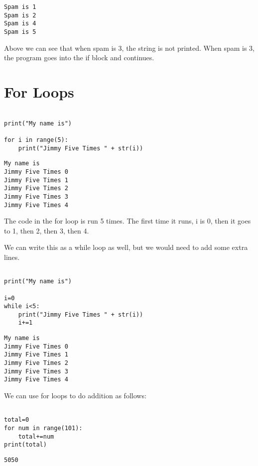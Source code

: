 \documentclass[11pt]{article}
\begin{document}
\begin{verbatim}
Spam is 1
Spam is 2
Spam is 4
Spam is 5
\end{verbatim}



Above we can see that when spam is 3, the string is not printed. When spam is 3, the program goes into the if block and continues.

\section{For Loops}
\label{sec:org10e0924}

\begin{verbatim}

print("My name is")

for i in range(5):
    print("Jimmy Five Times " + str(i))

\end{verbatim}

\begin{verbatim}
My name is
Jimmy Five Times 0
Jimmy Five Times 1
Jimmy Five Times 2
Jimmy Five Times 3
Jimmy Five Times 4
\end{verbatim}


The code in the for loop is run 5 times. The first time it runs, i is 0, then it goes to 1, then 2, then 3, then 4.

We can write this as a while loop as well, but we would need to add some extra lines.


\begin{verbatim}

print("My name is")

i=0
while i<5:
    print("Jimmy Five Times " + str(i))
    i+=1

\end{verbatim}

\begin{verbatim}
My name is
Jimmy Five Times 0
Jimmy Five Times 1
Jimmy Five Times 2
Jimmy Five Times 3
Jimmy Five Times 4
\end{verbatim}


We can use for loops to do addition as follows:

\begin{verbatim}

total=0
for num in range(101):
    total+=num
print(total)

\end{verbatim}

\begin{verbatim}
5050
\end{verbatim}
\end{document}
